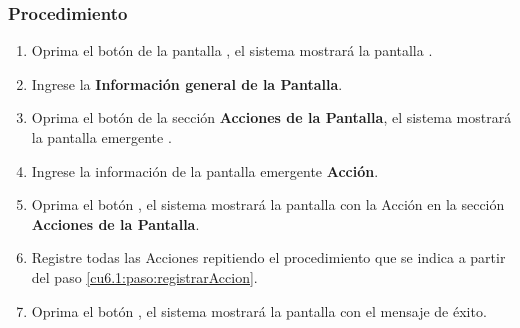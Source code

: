 \subsubsection{Procedimiento}
\begin{enumerate}
	\item Oprima el botón  de la pantalla , el sistema mostrará la pantalla . 

	
	\item Ingrese la \textbf{Información general de la Pantalla}.
	
	\item Oprima el botón  de la sección \textbf{Acciones de la Pantalla}, el sistema mostrará la pantalla emergente . \label{cu6.1:paso:registrarAccion} 

	
	
	\item Ingrese la información de la pantalla emergente \textbf{Acción}.
	
	\item Oprima el botón , el sistema mostrará la pantalla  con la Acción en la sección \textbf{Acciones de la Pantalla}.
	
	\item Registre todas las Acciones repitiendo el procedimiento que se indica a partir del paso \ref{cu6.1:paso:registrarAccion}.
	
	\item Oprima el botón , el sistema mostrará la pantalla  con el mensaje de éxito.
\end{enumerate}


